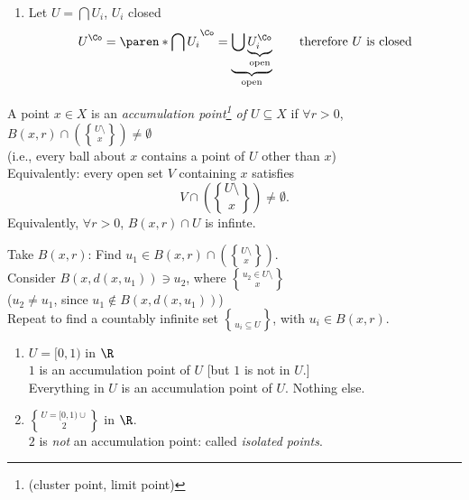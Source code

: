 \pf \begin{enumerate}
\item Let $U=\bigcap U_i$, $U_i$ closed
\[ U^\Co = \paren*{\bigcap U_i}^\Co = \underbrace{\bigcup \underbrace{U_i^\Co}_{\text{open}}}_{\text{open}} \qquad\text{therefore $U$ is closed} \]
\end{enumerate}
 A point $x\in X$ is an \emph{accumulation point\footnote{(cluster point, limit point)} of $U\subseteq X$} if $\forall r>0$, $B(x,r)\cap(U\setminus\brace{x})\neq\emptyset$ \\
(i.e., every ball about $x$ contains a point of $U$ other than $x$) \\
Equivalently: every open set $V$ containing $x$ satisfies \[ V\cap(U\setminus\brace{x})\neq\emptyset . \]
Equivalently, $\forall r>0$, $B(x,r)\cap U$ is infinte.

Take $B(x,r)$: Find $u_1\in B(x,r)\cap (U\setminus\brace{x})$. \\
Consider $B(x,d(x,u_1))\owns u_2$, where $u_2\in U\setminus\brace{x}$ \\
($u_2\neq u_1$, since $u_1\notin B(x,d(x,u_1))$) \\
Repeat to find a countably infinite set $\brace{u_i}\subseteq U$, with $u_i\in B(x,r)$.

\ex \begin{enumerate}
\item $U=[0,1)$ in $\R$\marginpar{figure: $[0,1)$ real line} \\
$1$ is an accumulation point of $U$ [but $1$ is not in $U$.] \\
Everything in $U$ is an accumulation point of $U$.  Nothing else.
\item $U=[0,1)\cup\brace{2}$ in $\R$.\marginpar{figure: $[0,1)\cup\brace2$ real line} \\
$2$ is \emph{not} an accumulation point: called \emph{isolated points}.
\end{enumerate}
